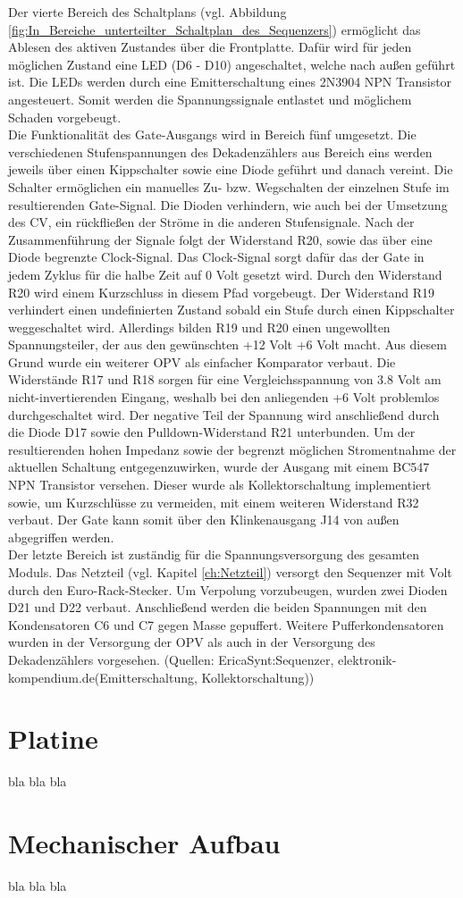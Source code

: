 Der vierte Bereich des Schaltplans (vgl. Abbildung \ref{fig:In_Bereiche_unterteilter_Schaltplan_des_Sequenzers}) ermöglicht das Ablesen des aktiven Zustandes über die Frontplatte. Dafür wird für jeden möglichen Zustand eine LED (D6 - D10) angeschaltet, welche nach außen geführt ist. Die LEDs werden durch eine Emitterschaltung eines 2N3904 NPN Transistor angesteuert. Somit werden die Spannungssignale entlastet und möglichem Schaden vorgebeugt.\\
Die Funktionalität des Gate-Ausgangs wird in Bereich fünf umgesetzt. Die verschiedenen Stufenspannungen des Dekadenzählers aus Bereich eins werden jeweils über einen Kippschalter sowie eine Diode geführt und danach vereint. Die Schalter ermöglichen ein manuelles Zu- bzw. Wegschalten der einzelnen Stufe im resultierenden Gate-Signal. Die Dioden verhindern, wie auch bei der Umsetzung des CV, ein rückfließen der Ströme in die anderen Stufensignale. Nach der Zusammenführung der Signale folgt der Widerstand R20, sowie das über eine Diode begrenzte Clock-Signal. Das Clock-Signal sorgt dafür das der Gate in jedem Zyklus für die halbe Zeit auf 0 Volt gesetzt wird. Durch den Widerstand R20 wird einem Kurzschluss in diesem Pfad vorgebeugt. Der Widerstand R19 verhindert einen undefinierten Zustand sobald ein Stufe durch einen Kippschalter weggeschaltet wird. Allerdings bilden R19 und R20 einen ungewollten Spannungsteiler, der aus den gewünschten +12 Volt +6 Volt macht. Aus diesem Grund wurde ein weiterer OPV als einfacher Komparator verbaut. Die Widerstände R17 und R18 sorgen für eine Vergleichsspannung von 3.8 Volt am nicht-invertierenden Eingang, weshalb bei den anliegenden +6 Volt problemlos durchgeschaltet wird. Der negative Teil der Spannung wird anschließend durch die Diode D17 sowie den Pulldown-Widerstand R21 unterbunden. Um der resultierenden hohen Impedanz sowie der begrenzt möglichen Stromentnahme der aktuellen Schaltung entgegenzuwirken, wurde der Ausgang mit einem BC547 NPN Transistor versehen. Dieser wurde als Kollektorschaltung implementiert sowie, um Kurzschlüsse zu vermeiden, mit einem weiteren Widerstand R32 verbaut. Der Gate kann somit über den Klinkenausgang J14 von außen abgegriffen werden.\\
Der letzte Bereich ist zuständig für die Spannungsversorgung des gesamten Moduls. Das Netzteil (vgl. Kapitel \ref{ch:Netzteil}) versorgt den Sequenzer mit  Volt durch den Euro-Rack-Stecker. Um Verpolung vorzubeugen, wurden zwei Dioden D21 und D22 verbaut. Anschließend werden die beiden Spannungen mit den Kondensatoren C6 und C7 gegen Masse gepuffert. Weitere Pufferkondensatoren wurden in der Versorgung der OPV als auch in der Versorgung des Dekadenzählers vorgesehen. (Quellen: EricaSynt:Sequenzer, elektronik-kompendium.de(Emitterschaltung, Kollektorschaltung))

\section{Platine}
bla bla bla

\section{Mechanischer Aufbau}
bla bla bla
